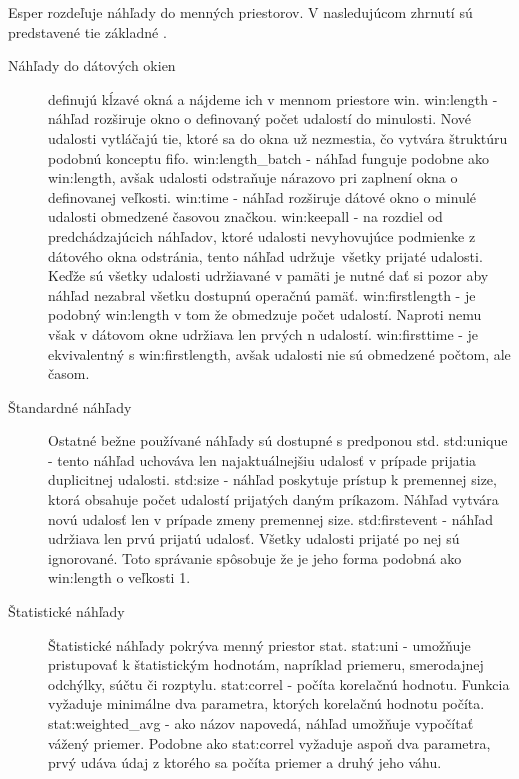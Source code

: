 		Esper rozdeľuje náhľady do menných priestorov. V nasledujúcom zhrnutí sú predstavené tie základné \cite{web:Esper-doc}.		
		\begin{description}
			\item[Náhľady do dátových okien] definujú kĺzavé okná a nájdeme ich v mennom priestore win.
				\subitem win:length - náhľad rozširuje okno o definovaný počet udalostí do minulosti. Nové udalosti vytláčajú tie, ktoré sa do okna už nezmestia, čo vytvára štruktúru podobnú konceptu fifo.
				\subitem win:length\_batch - náhľad funguje podobne ako win:length, avšak udalosti odstraňuje nárazovo pri zaplnení okna o definovanej veľkosti.
				\subitem win:time - náhľad rozširuje dátové okno o minulé udalosti obmedzené časovou značkou.
				\subitem win:keepall - na rozdiel od predchádzajúcich náhľadov, ktoré udalosti nevyhovujúce podmienke z dátového okna odstránia, tento náhľad udržuje\ všetky prijaté udalosti. Keďže sú všetky udalosti udržiavané v pamäti je nutné dať si pozor aby náhľad nezabral všetku dostupnú operačnú pamäť.
				\subitem win:firstlength - je podobný win:length v tom že obmedzuje počet udalostí. Naproti nemu však v dátovom okne udržiava len prvých n udalostí.
				\subitem win:firsttime - je ekvivalentný s win:firstlength, avšak udalosti nie sú obmedzené počtom, ale časom.

			\item[Štandardné náhľady] Ostatné bežne používané náhľady sú dostupné s predponou std.
				\subitem std:unique - tento náhľad uchováva len najaktuálnejšiu udalosť v prípade prijatia duplicitnej udalosti.
				\subitem std:size - náhľad poskytuje prístup k premennej size, ktorá obsahuje počet udalostí prijatých daným príkazom. Náhľad vytvára novú udalosť len v prípade zmeny premennej size. 
				\subitem std:firstevent - náhľad udržiava len prvú prijatú udalosť. Všetky udalosti prijaté po nej sú ignorované. Toto správanie spôsobuje že je jeho forma podobná ako win:length o veľkosti 1.

			\item[Štatistické náhľady] Štatistické náhľady pokrýva menný priestor stat.
				\subitem stat:uni - umožňuje pristupovať k štatistickým hodnotám, napríklad priemeru, smerodajnej odchýlky, súčtu či rozptylu.
				\subitem stat:correl - počíta korelačnú hodnotu. Funkcia vyžaduje minimálne dva parametra, ktorých korelačnú hodnotu počíta.
				\subitem stat:weighted\_avg - ako názov napovedá, náhľad umožňuje vypočítať vážený priemer. Podobne ako stat:correl vyžaduje aspoň dva parametra, prvý udáva údaj z ktorého sa počíta priemer a druhý jeho váhu.
		\end{description}
		

